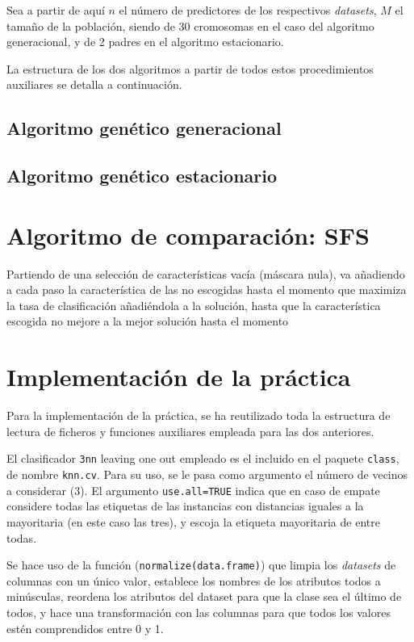 \documentclass[a4paper,11pt]{article}
\begin{document}
Sea a partir de aquí $n$ el número de predictores de los respectivos \textit{datasets}, $M$ el tamaño de la población, 
siendo de 30 cromosomas en el caso del algoritmo generacional, y de 2 padres en el algoritmo estacionario.

La estructura de los dos algoritmos a partir de todos estos procedimientos auxiliares se detalla a continuación.

\subsection{Algoritmo genético generacional}

\small{\texttt{}}
\normalsize

\subsection{Algoritmo genético estacionario}

\small{\texttt{}}
\normalsize

\section{Algoritmo de comparación: SFS}
\small{\texttt{}}

Partiendo de una selección de características vacía (máscara nula), va añadiendo a cada paso la característica
de las no escogidas hasta el momento que maximiza la tasa de clasificación añadiéndola a la solución, hasta
que la característica escogida no mejore a la mejor solución hasta el momento

\section{Implementación de la práctica}
Para la implementación de la práctica, se ha reutilizado toda la estructura de lectura de ficheros y funciones auxiliares
empleada para las dos anteriores.

El clasificador \texttt{3nn} leaving one out empleado es el incluido en el paquete \texttt{class}, de nombre
\texttt{knn.cv}. Para su uso, se le pasa como argumento el número de vecinos a considerar (3). El argumento 
\texttt{use.all=TRUE} indica que en caso de empate considere todas las etiquetas de las instancias con distancias 
iguales a la mayoritaria (en este caso las tres), y escoja la etiqueta mayoritaria de entre todas. 

Se hace uso de la función (\texttt{normalize(data.frame)}) que limpia los \textit{datasets} de columnas con
un único valor, establece los nombres de los atributos todos a minúsculas, reordena los atributos del dataset para que
la clase sea el último de todos, y hace una transformación con las columnas para que todos los valores estén comprendidos
entre 0 y 1.
\end{document}
